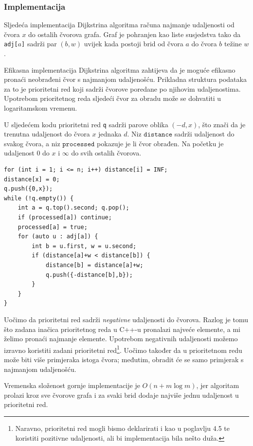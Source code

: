 \subsubsection{Implementacija}

Sljedeća implementacija Dijkstrina algoritma
računa najmanje udaljenosti od čvora $x$
do ostalih čvorova grafa.
Graf je pohranjen kao liste susjedstva
tako da \texttt{adj[$a$]} sadrži par $(b,w)$
uvijek kada postoji brid od čvora $a$ do čvora $b$
težine $w$.

Efikasna implementacija Dijkstrina algoritma
zahtijeva da je moguće efikasno pronaći
neobrađeni čvor s najmanjom udaljenošću.
Prikladna struktura podataka za to je prioritetni red
koji sadrži čvorove poredane po njihovim udaljenostima.
Upotrebom prioritetnog reda sljedeći čvor za obradu
može se dohvatiti u logaritamskom vremenu.

U sljedećem kodu prioritetni red
\texttt{q} sadrži parove oblika $(-d,x)$,
što znači da je trenutna udaljenost do čvora $x$ jednaka $d$.
Niz $\texttt{distance}$ sadrži udaljenost do
svakog čvora, a niz $\texttt{processed}$ pokazuje
je li čvor obrađen.
Na početku je udaljenost $0$ do $x$ i $\infty$ do svih ostalih čvorova.

\begin{lstlisting}
for (int i = 1; i <= n; i++) distance[i] = INF;
distance[x] = 0;
q.push({0,x});
while (!q.empty()) {
    int a = q.top().second; q.pop();
    if (processed[a]) continue;
    processed[a] = true;
    for (auto u : adj[a]) {
        int b = u.first, w = u.second;
        if (distance[a]+w < distance[b]) {
            distance[b] = distance[a]+w;
            q.push({-distance[b],b});
        }
    }
}
\end{lstlisting}

Uočimo da prioritetni red sadrži \emph{negativne}
udaljenosti do čvorova.
Razlog je tomu što
zadana inačica prioritetnog reda u C++-u pronalazi najveće
elemente, a mi želimo pronaći najmanje elemente.
Upotrebom negativnih udaljenosti
možemo izravno koristiti zadani prioritetni red\footnote{Naravno,
prioritetni red mogli bismo deklarirati i kao u poglavlju 4.5
te koristiti pozitivne udaljenosti, ali bi implementacija bila nešto duža.}.
Uočimo također da u prioritetnom redu može biti više primjeraka istoga
čvora; međutim, obradit će se samo primjerak s
najmanjom udaljenošću.

Vremenska složenost gornje implementacije je
$O(n+m \log m)$, jer algoritam prolazi kroz
sve čvorove grafa i za svaki brid dodaje
najviše jednu udaljenost u prioritetni red.

